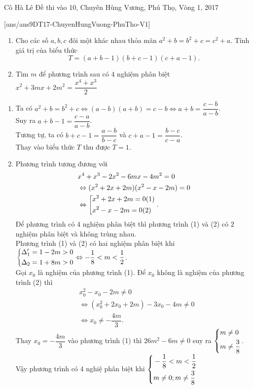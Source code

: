 \begin{name}
{Cô Hà Lê}
{Đề thi vào 10, Chuyên Hùng Vương, Phú Thọ, Vòng 1, 2017}
\end{name}
\setcounter{ex}{0}
[ans/ans9DT17-ChuyenHungVuong-PhuTho-V1]
\begin{ex}%
    \hfill
    \begin{enumerate}
        \item Cho các số $a, b, c$ đôi một khác nhau thỏa mãn $a^2+b=b^2+c=c^2+a$. Tính giá trị của biểu thức \[T=(a+b-1)(b+c-1)(c+a-1).\]
        \item Tìm $m$ để phương trình sau có $4$ nghiệm phân biệt $x^2+3mx+2m^2=\dfrac{x^4+x^3}{2}$
    \end{enumerate}
\loigiai
    {
    \begin{enumerate}
        \item Ta có $a^2+b=b^2+c \Leftrightarrow (a-b)(a+b)=c-b \Leftrightarrow a+b=\dfrac{c-b}{a-b}$. \\
Suy ra $a+b-1=\dfrac{c-a}{a-b}$.\\
Tương tự, ta có $b+c-1=\dfrac{a-b}{b-c}$ và $c+a-1=\dfrac{b-c}{c-a}$.\\
Thay vào biểu thức $T$ thu được $T=1$.
        \item Phương trình tương đương với
\[\begin{aligned}
& x^4+x^3-2x^2-6mx-4m^2=0\\ 
& \Leftrightarrow (x^2+2x+2m)(x^2-x-2m)=0\\
&\Leftrightarrow \left[\begin{aligned}& x^2+2x+2m=0 (1)\\ &x^2-x-2m=0 (2)\end{aligned}\right..
\end{aligned}
\]
Để phương trình có $4$ nghiệm phân biệt thì phương trình (1) và (2) có $2$ nghiệm phân biệt và không trùng nhau. \\
Phương trình (1) và (2) có hai nghiệm phân biệt khi $\left\{\begin{aligned}&\Delta'_1=1-2m>0 \\ & \Delta_2=1+8m>0\end{aligned}\right. \Leftrightarrow -\dfrac{1}{8}<m<\dfrac{1}{2}$.\\
Gọi $x_0$ là nghiệm của phương trình (1). Để $x_0$ không là nghiệm của phương trình (2) thì 
\[
\begin{aligned}
&x_0^2-x_0-2m \ne 0\\ 
& \Leftrightarrow (x_0^2+2x_0+2m)-3x_0-4m \ne 0\\
&\Leftrightarrow x_0 \ne - \dfrac{4m}{3}.
\end{aligned}\]
Thay $x_0 = - \dfrac{4m}{3}$ vào phương trình (1) thì $26m^2-6m \ne 0$ suy ra $\left\{\begin{aligned}& m \ne 0 \\& m \ne \dfrac{3}{8}\end{aligned}\right.$.\\
Vậy phương trình có $4$ nghiệ phân biệt khi $\left\{\begin{aligned}& -\dfrac{1}{8}<m<\dfrac{1}{2} \\ & m \ne 0; m \ne \dfrac{3}{8}\end{aligned}\right.$
    \end{enumerate}
    }
\end{ex}

